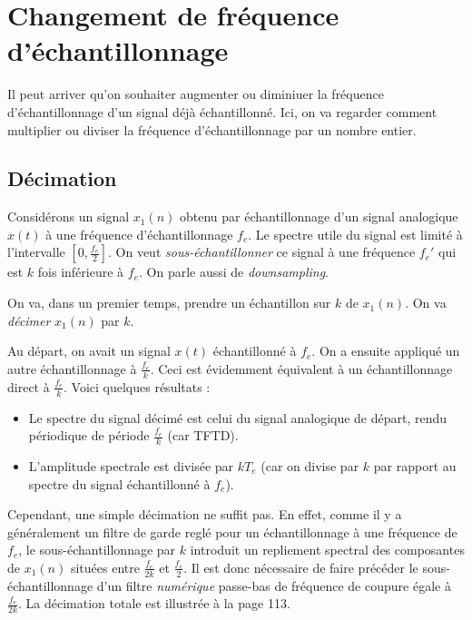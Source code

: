 
    \section{Changement de fréquence d'échantillonnage}
        Il peut arriver qu'on souhaiter augmenter ou diminiuer la fréquence d'échantillonnage d'un signal déjà échantillonné. Ici, on va regarder comment multiplier ou diviser la fréquence d'échantillonnage par un nombre entier.

        \subsection{Décimation}
            Considérons un signal $x_1(n)$ obtenu par échantillonnage d'un signal analogique $x(t)$ à une fréquence d'échantillonnage $f_e$. Le spectre utile du signal est limité à l'intervalle $[0, \frac{f_e}{2}]$. On veut \textit{sous-échantillonner} ce signal à une fréquence $f_e'$ qui est $k$ fois inférieure à $f_e$. On parle aussi de \textit{downsampling}.

            On va, dans un premier temps, prendre un échantillon sur $k$ de $x_1(n)$. On va \textit{décimer} $x_1(n)$ par $k$.

            Au départ, on avait un signal $x(t)$ échantillonné à $f_e$. On a ensuite appliqué un autre échantillonnage à $\frac{f_e}{k}$. Ceci est évidemment équivalent à un échantillonnage direct à $\frac{f_e}{k}$. Voici quelques résultats :
            \begin{itemize}
                \item Le spectre du signal décimé est celui du signal analogique de départ, rendu périodique de période $\frac{f_e}{k}$ (car TFTD).
                \item L'amplitude spectrale est divisée par $kT_e$ (car on divise par $k$ par rapport au spectre du signal échantillonné à $f_e$).
            \end{itemize}

            Cependant, une simple décimation ne suffit pas. En effet, comme il y a généralement un filtre de garde reglé pour un échantillonnage à une fréquence de $f_e$, le sous-échantillonnage par $k$ introduit un repliement spectral des composantes de $x_1(n)$ situées entre $\frac{f_e}{2k}$ et $\frac{f_e}{2}$. Il est donc nécessaire de faire précéder le sous-échantillonnage d'un filtre \textit{numérique} passe-bas de fréquence de coupure égale à $\frac{f_e}{2k}$. La décimation totale est illustrée à la page 113.

